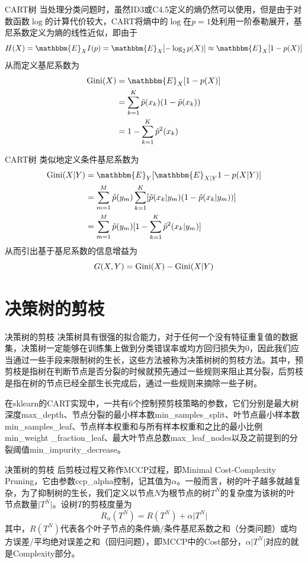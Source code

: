 \documentclass{ctexbeamer}        %
\begin{document}
\begin{frame}{CART树}
当处理分类问题时，虽然ID3或C4.5定义的熵仍然可以使用，但是由于对数函数$\log$的计算代价较大，CART将熵中的$\log$在$p=1$处利用一阶泰勒展开，基尼系数定义为熵的线性近似，即由于
$$
H(X)=\mathbbm{E}_XI(p)=\mathbbm{E}_X[-\log_2p(X)]\approx\mathbbm{E}_X[1-p(X)]
$$
从而定义基尼系数为
\begin{align*}
{\rm Gini}(X)&=\mathbbm{E}_X[1-p(X)]\\
&=\sum_{k=1}^K \tilde{p}(x_k)(1-\tilde{p}(x_k))\\
&=1-\sum_{k=1}^K\tilde{p}^2(x_k)
\end{align*}
\end{frame}
\begin{frame}{CART树}
类似地定义条件基尼系数为
\begin{align*}
{\rm Gini}(X\vert Y)&=\mathbbm{E}_Y[\mathbbm{E}_{X\vert Y}1-p(X\vert Y)]\\
&=\sum_{m=1}^M \tilde{p}(y_m)\sum_{k=1}^K[\tilde{p}(x_k\vert y_m)(1-\tilde{p}(x_k\vert y_m))]\\
&=\sum_{m=1}^M \tilde{p}(y_m)[1-\sum_{k=1}^K\tilde{p}^2(x_k\vert y_m)]
\end{align*}
从而引出基于基尼系数的信息增益为
$$
G(X,Y)={\rm Gini}(X)-{\rm Gini}(X\vert Y)
$$
\end{frame}
\section{决策树的剪枝}

\begin{frame}{决策树的剪枝}
决策树具有很强的拟合能力，对于任何一个没有特征重复值的数据集，决策树一定能够在训练集上做到分类错误率或均方回归损失为0，因此我们应当通过一些手段来限制树的生长，这些方法被称为决策树树的剪枝方法。其中，预剪枝是指树在判断节点是否分裂的时候就预先通过一些规则来阻止其分裂，后剪枝是指在树的节点已经全部生长完成后，通过一些规则来摘除一些子树。
\newline

在sklearn的CART实现中，一共有6个控制预剪枝策略的参数，它们分别是最大树深度max\_depth、节点分裂的最小样本数min\_samples\_split、叶节点最小样本数min\_samples\_leaf、节点样本权重和与所有样本权重和之比的最小比例min\_weight
\_fraction\_leaf、最大叶节点总数max\_leaf\_nodes以及之前提到的分裂阈值min\_impurity\_decrease。
\end{frame}

\begin{frame}{决策树的剪枝}
后剪枝过程又称作MCCP过程，即Minimal Cost-Complexity Pruning，它由参数ccp\_alpha控制，记其值为$\alpha$。一般而言，树的叶子越多就越复杂，为了抑制树的生长，我们定义以节点$N$为根节点的树$T^N$的复杂度为该树的叶节点数量$\vert T^N\vert$。设树$T$的剪枝度量为
$$R_\alpha(T^N)=R(T^N)+\alpha\vert T^N\vert $$
其中，$R(T^N)$代表各个叶子节点的条件熵/条件基尼系数之和（分类问题）或均方误差/平均绝对误差之和（回归问题），即MCCP中的Cost部分，$\alpha\vert T^N\vert$对应的就是Complexity部分。
\end{frame}
\end{document}
